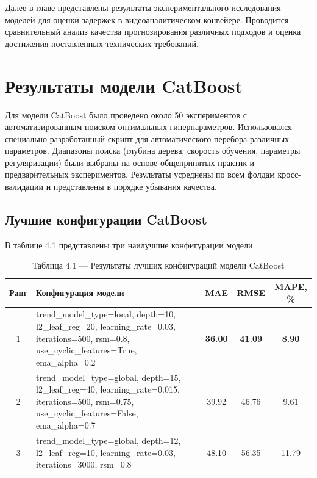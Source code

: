 \hspace*{1.25cm}Далее в главе представлены результаты экспериментального исследования моделей для оценки задержек в видеоаналитическом конвейере. Проводится сравнительный анализ качества прогнозирования различных подходов и оценка достижения поставленных технических требований.

\section{Результаты модели CatBoost}
\label{sec:catboost_results}

\hspace*{1.25cm}Для модели CatBoost было проведено около 50 экспериментов с автоматизированным поиском оптимальных гиперпараметров. Использовался специально разработанный скрипт для автоматического перебора различных параметров. Диапазоны поиска (глубина дерева, скорость обучения, параметры регуляризации) были выбраны на основе общепринятых практик и предварительных экспериментов. Результаты усреднены по всем фолдам кросс-валидации и представлены в порядке убывания качества.

\subsection{Лучшие конфигурации CatBoost}

\hspace*{1.25cm}В таблице 4.1 представлены три наилучшие конфигурации модели.

\begin{table}[H]
	\centering
	\caption*{Таблица 4.1 --- Результаты лучших конфигураций модели CatBoost}
	\begin{tabular}{|c|p{8cm}|c|c|c|}
		\hline
		\textbf{Ранг} & \textbf{Конфигурация модели} & \textbf{MAE} & \textbf{RMSE} & \textbf{MAPE, \%} \\
		\hline
		1 & trend\_model\_type=local, depth=10, l2\_leaf\_reg=20, learning\_rate=0.03, iterations=500, rsm=0.8, use\_cyclic\_features=True, ema\_alpha=0.2 & \textbf{36.00} & \textbf{41.09} & \textbf{8.90} \\
		\hline
		2 & trend\_model\_type=global, depth=15, l2\_leaf\_reg=40, learning\_rate=0.015, iterations=500, rsm=0.75, use\_cyclic\_features=False, ema\_alpha=0.7 & 39.92 & 46.76 & 9.61 \\
		\hline
		3 & trend\_model\_type=global, depth=12, l2\_leaf\_reg=10, learning\_rate=0.03, iterations=3000, rsm=0.8 & 48.10 & 56.35 & 11.79 \\
		\hline
	\end{tabular}
	\label{tab:catboost_results}
\end{table}


